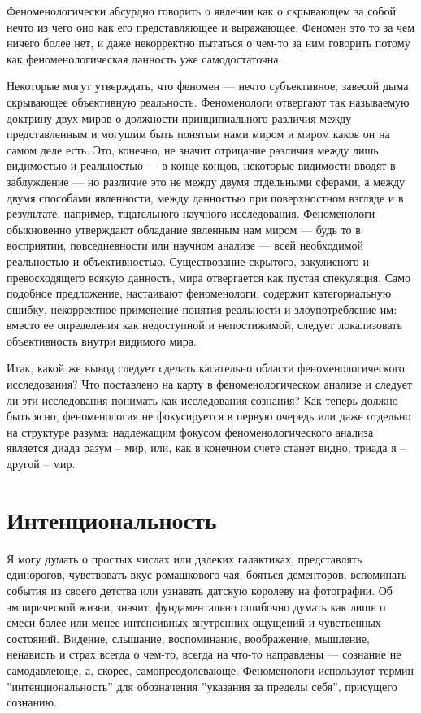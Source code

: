 \documentclass[11pt]{book}
\begin{document}
\smallskip
{}\relax
{}\relax

Феноменологически абсурдно говорить о явлении как о скрывающем за собой нечто из чего оно как его представляющее и выражающее. Феномен это то за чем ничего более нет, и даже некорректно пытаться о чем-то за ним говорить потому как феноменологическая данность уже самодостаточна.

\relax
{}\relax
\smallskip

Некоторые могут утверждать, что феномен --- нечто субъективное, завесой дыма скрывающее объективную реальность. Феноменологи отвергают так называемую доктрину двух миров о должности принципиального различия между представленным и могущим быть понятым нами миром и миром каков он на самом деле есть. Это, конечно, не значит отрицание различия между лишь видимостью и реальностью --- в конце концов, некоторые видимости вводят в заблуждение --- но различие это не между двумя отдельными сферами, а между двумя способами явленности, между данностью при поверхностном взгляде и в результате, например, тщательного научного исследования. Феноменологи обыкновенно утверждают обладание явленным нам миром --- будь то в восприятии, повседневности или научном анализе --- всей необходимой реальностью и объективностью. Существование скрытого, закулисного и превосходящего всякую данность, мира отвергается как пустая спекуляция. Само подобное предложение, настаивают феноменологи, содержит категориальную ошибку, некорректное применение понятия реальности и злоупотребление им: вместо ее определения как недоступной и непостижимой, следует локализовать объективность внутри видимого мира.

Итак, какой же вывод следует сделать касательно области феноменологического исследования? Что поставлено на карту в феноменологическом анализе и следует ли эти исследования понимать как исследования сознания? Как теперь должно быть ясно, феноменология не фокусируется в первую очередь или даже отдельно на структуре разума: надлежащим фокусом феноменологического анализа является диада разум -- мир, или, как в конечном счете станет видно, триада я -- другой -- мир.

\chapter{Интенциональность}

Я могу думать о простых числах или далеких галактиках, представлять единорогов, чувствовать вкус ромашкового чая, бояться дементоров, вспоминать события из своего детства или узнавать датскую королеву на фотографии. Об эмпирической жизни, значит, фундаментально ошибочно думать как лишь о смеси более или менее интенсивных внутренних ощущений и чувственных состояний. Видение, слышание, воспоминание, воображение, мышление, ненависть и страх всегда о чем-то, всегда на что-то направлены --- сознание не самодавлеюще, а, скорее, самопреодолевающе. Феноменологи используют термин ''интенциональность'' для обозначения ''указания за пределы себя'', присущего сознанию.
\end{document}
